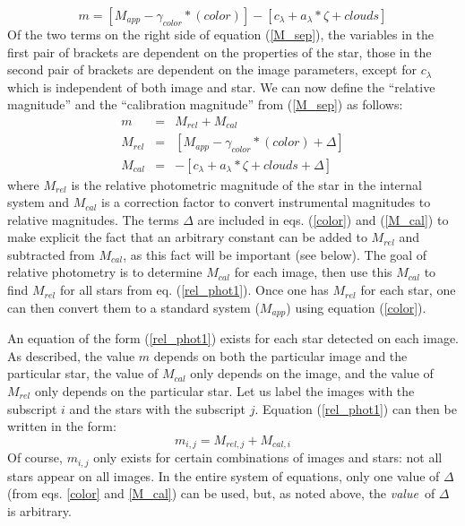 \documentclass{article}
\begin{document}
\begin{equation}        
m = [M_{app} - \gamma_{color}*(color)] - [c_{\lambda} + a_{\lambda}*\zeta + clouds]
\label{M_sep}
\end{equation}
Of the two terms on the right side of equation (\ref{M_sep}), the variables
in the first pair of brackets are dependent on the properties of the
star, those in the second pair of brackets are dependent on the image parameters,
except for $c_{\lambda}$ which is independent of both image and star.
We can now define the ``relative magnitude'' and the ``calibration
magnitude'' from (\ref{M_sep}) as follows:
\begin{eqnarray}
        m       & = & M_{rel} + M_{cal} \label{rel_phot1}\\
        M_{rel} & = & [M_{app} - \gamma_{color}*(color) + \Delta] \label{color}\\
        M_{cal} & = & - [c_{\lambda} + a_{\lambda}*\zeta + clouds + \Delta] \label{M_cal}
\end{eqnarray}
where $M_{rel}$ is the relative photometric magnitude of the star in
the internal system and $M_{cal}$ is a correction factor to convert
instrumental magnitudes to relative magnitudes.  The terms $\Delta$
are included in eqs. (\ref{color}) and (\ref{M_cal}) to make explicit
the fact that an arbitrary constant can be added to $M_{rel}$ and
subtracted from $M_{cal}$, as this fact will be important (see below).
The goal of relative photometry is to determine $M_{cal}$ for each
image, then use this $M_{cal}$ to find $M_{rel}$ for all stars from
eq. (\ref{rel_phot1}).  Once one has $M_{rel}$ for each star, one can
then convert them to a standard system ($M_{app}$) using equation
(\ref{color}).

        An equation of the form (\ref{rel_phot1}) exists for each star
detected on each image.  As described, the value $m$ depends on both
the particular image and the particular star, the value of $M_{cal}$
only depends on the image, and the value of $M_{rel}$ only depends on
the particular star.  Let us label the images with the subscript $i$
and the stars with the subscript $j$.  Equation (\ref{rel_phot1}) can
then be written in the form:
\begin{equation}
m_{i,j} = M_{rel,j} + M_{cal,i} \label{rel_phot}
\end{equation}
Of course, $m_{i,j}$ only exists for certain combinations of images
and stars: not all stars appear on all images.  In the entire system
of equations, only one value of $\Delta$ (from eqs. \ref{color} and
\ref{M_cal}) can be used, but, as noted above, the {\em value}\ of
$\Delta$ is arbitrary.
\end{document}
